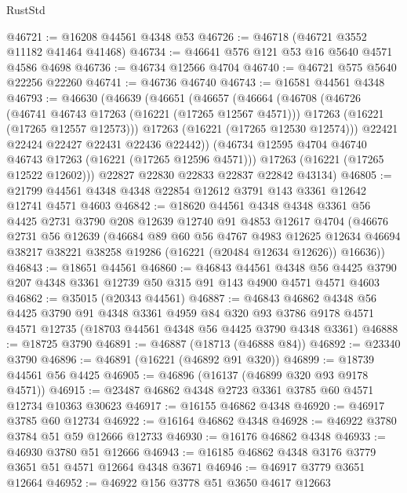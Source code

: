\begin{lexlean}{RustStd}
\begin{coremodule}
@46721 := @16208 @44561 @4348 @53
@46726 := @46718 (@46721 @3552 @11182 @41464 @41468)
@46734 := @46641 @576 @121 @53 @16 @5640 @4571 @4586 @4698
@46736 := @46734 @12566 @4704
@46740 := @46721 @575 @5640 @22256 @22260
@46741 := @46736 @46740
@46743 := @16581 @44561 @4348
@46793 := @46630
    (@46639
      (@46651
        (@46657
          (@46664
            (@46708
              (@46726
                (@46741 @46743 @17263 (@16221 (@17265 @12567 @4571)))
                @17263
                (@16221 (@17265 @12557 @12573)))
              @17263
              (@16221 (@17265 @12530 @12574)))
            @22421
            @22424
            @22427
            @22431
            @22436
            @22442))
        (@46734 @12595 @4704 @46740 @46743 @17263 (@16221 (@17265 @12596 @4571)))
        @17263
        (@16221 (@17265 @12522 @12602)))
      @22827
      @22830
      @22833
      @22837
      @22842
      @43134)
@46805 := @21799 @44561 @4348 @4348 @22854 @12612 @3791 @143 @3361 @12642 @12741 @4571 @4603
@46842 := @18620
    @44561
    @4348
    @4348
    @3361
    @56
    @4425
    @2731
    @3790
    @208
    @12639
    @12740
    @91
    @4853
    @12617
    @4704
    (@46676
      @2731
      @56
      @12639
      (@46684
        @89
        @60
        @56
        @4767
        @4983
        @12625
        @12634
        @46694
        @38217
        @38221
        @38258
        @19286
        (@16221 (@20484 @12634 @12626))
        @16636))
@46843 := @18651 @44561
@46860 := @46843
    @44561
    @4348
    @56
    @4425
    @3790
    @207
    @4348
    @3361
    @12739
    @50
    @315
    @91
    @143
    @4900
    @4571
    @4571
    @4603
@46862 := @35015 (@20343 @44561)
@46887 := @46843
    @46862
    @4348
    @56
    @4425
    @3790
    @91
    @4348
    @3361
    @4959
    @84
    @320
    @93
    @3786
    @9178
    @4571
    @4571
    @12735
    (@18703 @44561 @4348 @56 @4425 @3790 @4348 @3361)
@46888 := @18725 @3790
@46891 := @46887 (@18713 (@46888 @84))
@46892 := @23340 @3790
@46896 := @46891 (@16221 (@46892 @91 @320))
@46899 := @18739 @44561 @56 @4425
@46905 := @46896 (@16137 (@46899 @320 @93 @9178 @4571))
@46915 := @23487 @46862 @4348 @2723 @3361 @3785 @60 @4571 @12734 @10363 @30623
@46917 := @16155 @46862 @4348
@46920 := @46917 @3785 @60 @12734
@46922 := @16164 @46862 @4348
@46928 := @46922 @3780 @3784 @51 @59 @12666 @12733
@46930 := @16176 @46862 @4348
@46933 := @46930 @3780 @51 @12666
@46943 := @16185 @46862 @4348 @3176 @3779 @3651 @51 @4571 @12664 @4348 @3671
@46946 := @46917 @3779 @3651 @12664
@46952 := @46922 @156 @3778 @51 @3650 @4617 @12663

\end{coremodule}
\end{lexlean}

